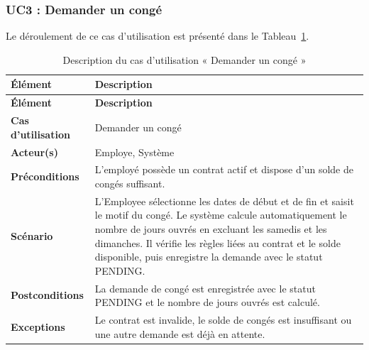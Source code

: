 \subsubsection{UC3 : Demander un congé}
Le déroulement de ce cas d'utilisation est présenté dans le Tableau~\ref{tab:uc3-demande-conge}.

\begin{longtable}{|>{\RaggedRight\arraybackslash}p{4cm}|>{\RaggedRight\arraybackslash}p{10.5cm}|}
\caption{Description du cas d'utilisation « Demander un congé »}
\label{tab:uc3-demande-conge}\\

\hline

\textbf{Élément} & \textbf{Description} \\

\hline

\endfirsthead

\hline

\textbf{Élément} & \textbf{Description} \\

\hline

\endhead

\textbf{Cas d'utilisation} &
Demander un congé \\

\hline

\textbf{Acteur(s)} &
Employe, Système \\

\hline

\textbf{Préconditions} &
L'employé possède un contrat actif et dispose d'un solde de congés suffisant. \\

\hline

\textbf{Scénario} &
L'Employee sélectionne les dates de début et de fin et saisit le motif du congé. Le système calcule automatiquement le nombre de jours ouvrés en excluant les samedis et les dimanches. Il vérifie les règles liées au contrat et le solde disponible, puis enregistre la demande avec le statut PENDING. \\

\hline

\textbf{Postconditions} &
La demande de congé est enregistrée avec le statut PENDING et le nombre de jours ouvrés est calculé. \\

\hline

\textbf{Exceptions} &
Le contrat est invalide, le solde de congés est insuffisant ou une autre demande est déjà en attente. \\

\hline


\end{longtable}


